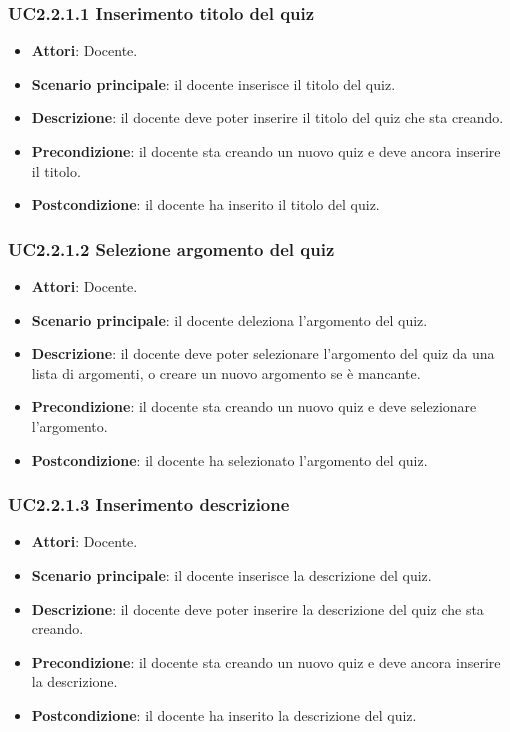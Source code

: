 \subsubsection{UC2.2.1.1 Inserimento titolo del quiz}
\begin{itemize}
\item \textbf{Attori}: Docente.
\item \textbf{Scenario principale}: il docente inserisce il titolo del quiz.
\item \textbf{Descrizione}: il docente deve poter inserire il titolo del quiz che sta creando.
\item \textbf{Precondizione}: il docente sta creando un nuovo quiz e deve ancora inserire il titolo.
\item \textbf{Postcondizione}: il docente ha inserito il titolo del quiz.
\end{itemize}
\subsubsection{UC2.2.1.2 Selezione argomento del quiz}
\begin{itemize}
\item \textbf{Attori}: Docente.
\item \textbf{Scenario principale}: il docente deleziona l'argomento del quiz.
\item \textbf{Descrizione}: il docente deve poter selezionare l'argomento del quiz da una lista di argomenti, o creare un nuovo argomento se è mancante.
\item \textbf{Precondizione}: il docente sta creando un nuovo quiz e deve selezionare l'argomento.
\item \textbf{Postcondizione}: il docente ha selezionato l'argomento del quiz.
\end{itemize}
\subsubsection{UC2.2.1.3 Inserimento descrizione}
\begin{itemize}
\item \textbf{Attori}: Docente.
\item \textbf{Scenario principale}: il docente inserisce la descrizione del quiz.
\item \textbf{Descrizione}: il docente deve poter inserire la descrizione del quiz che sta creando.
\item \textbf{Precondizione}: il docente sta creando un nuovo quiz e deve ancora inserire la descrizione.
\item \textbf{Postcondizione}: il docente ha inserito la descrizione del quiz.
\end{itemize}
